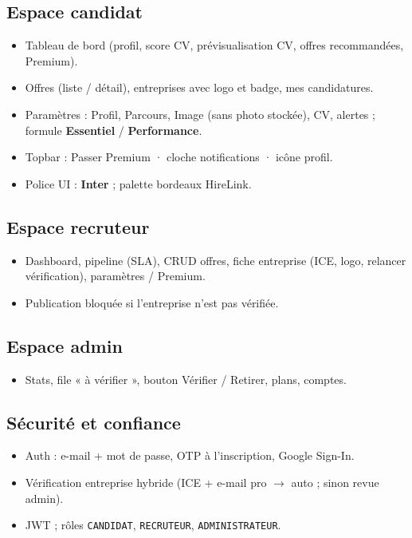 \documentclass[11pt,a4paper,oneside]{report}
\begin{document}
\subsection{Espace candidat}
\begin{itemize}[leftmargin=1.2em]
  \item Tableau de bord (profil, score CV, prévisualisation CV, offres recommandées, Premium).
  \item Offres (liste / détail), entreprises avec logo et badge, mes candidatures.
  \item Paramètres : Profil, Parcours, Image (sans photo stockée), CV, alertes ; formule \textbf{Essentiel} / \textbf{Performance}.
  \item Topbar : Passer Premium · cloche notifications · icône profil.
  \item Police UI : \textbf{Inter} ; palette bordeaux HireLink.
\end{itemize}

\subsection{Espace recruteur}
\begin{itemize}[leftmargin=1.2em]
  \item Dashboard, pipeline (SLA), CRUD offres, fiche entreprise (ICE, logo, relancer vérification), paramètres / Premium.
  \item Publication bloquée si l'entreprise n'est pas vérifiée.
\end{itemize}

\subsection{Espace admin}
\begin{itemize}[leftmargin=1.2em]
  \item Stats, file « à vérifier », bouton Vérifier / Retirer, plans, comptes.
\end{itemize}

\subsection{Sécurité et confiance}
\begin{itemize}[leftmargin=1.2em]
  \item Auth : e-mail + mot de passe, OTP à l'inscription, Google Sign-In.
  \item Vérification entreprise hybride (ICE + e-mail pro $\rightarrow$ auto ; sinon revue admin).
  \item JWT ; rôles \texttt{CANDIDAT}, \texttt{RECRUTEUR}, \texttt{ADMINISTRATEUR}.
\end{itemize}
\end{document}
